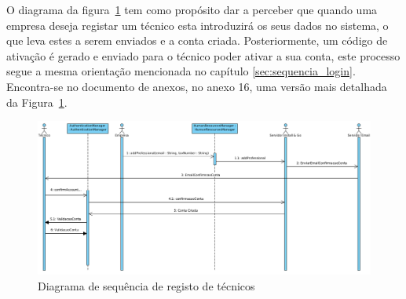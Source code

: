 O diagrama da figura~\ref{fig:45} tem como propósito dar a perceber que quando uma empresa deseja registar um técnico esta introduzirá os seus dados no sistema, o que leva estes a serem enviados e a conta criada. Posteriormente, um código de ativação é gerado e enviado para o técnico poder ativar a sua conta, este processo segue a mesma orientação mencionada no capítulo \ref{sec:sequencia_login}. Encontra-se no documento de anexos, no anexo 16, uma versão mais detalhada da Figura~\ref*{fig:45}.


\begin{figure}[htb]
  \centering
  \includegraphics[width=\textwidth]{images/diagramas/sequencia/registo_tecnico.png}
  \caption{Diagrama de sequência de registo de técnicos}
  \label{fig:45}
\end{figure}